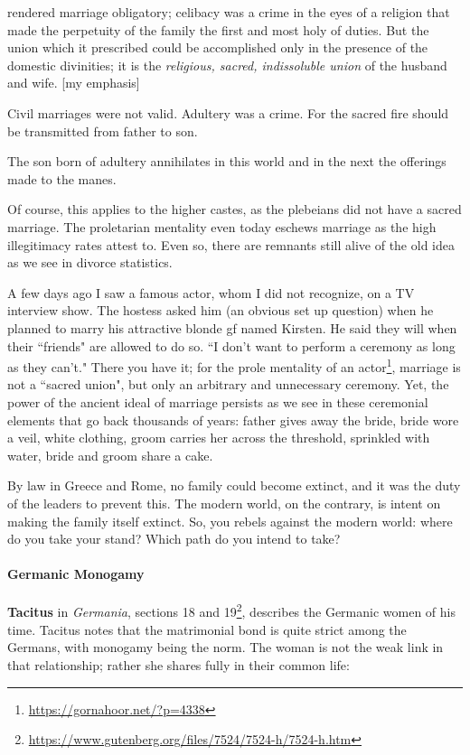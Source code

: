 \begin{quotex}
 rendered marriage obligatory; celibacy was a crime in the eyes of a religion that made the perpetuity of the family the first and most holy of duties. But the union which it prescribed could be accomplished only in the presence of the domestic divinities; it is the \emph{religious, sacred, indissoluble union} of the husband and wife. [my emphasis]

Civil marriages were not valid. Adultery was a crime. For the sacred fire should be transmitted from father to son.

The son born of adultery annihilates in this world and in the next the offerings made to the manes. 

\end{quotex}
Of course, this applies to the higher castes, as the plebeians did not have a sacred marriage. The proletarian mentality even today eschews marriage as the high illegitimacy rates attest to. Even so, there are remnants still alive of the old idea as we see in divorce statistics.

A few days ago I saw a famous actor, whom I did not recognize, on a TV interview show. The hostess asked him (an obvious set up question) when he planned to marry his attractive blonde gf named Kirsten. He said they will when their ``friends" are allowed to do so. ``I don't want to perform a ceremony as long as they can't." There you have it; for the prole mentality of an actor\footnote{\url{https://gornahoor.net/?p=4338}}, marriage is not a ``sacred union", but only an arbitrary and unnecessary ceremony. Yet, the power of the ancient ideal of marriage persists as we see in these ceremonial elements that go back thousands of years: father gives away the bride, bride wore a veil, white clothing, groom carries her across the threshold, sprinkled with water, bride and groom share a cake. 

By law in Greece and Rome, no family could become extinct, and it was the duty of the leaders to prevent this. The modern world, on the contrary, is intent on making the family itself extinct. So, you rebels against the modern world: where do you take your stand? Which path do you intend to take?

\paragraph{Germanic Monogamy}
\textbf{Tacitus} in \emph{Germania}, sections 18 and 19\footnote{\url{https://www.gutenberg.org/files/7524/7524-h/7524-h.htm}}, describes the Germanic women of his time. Tacitus notes that the matrimonial bond is quite strict among the Germans, with monogamy being the norm. The woman is not the weak link in that relationship; rather she shares fully in their common life:

